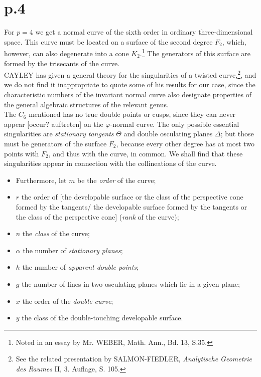 \documentclass[leqno]{article}
\begin{document}
\section{p.4}
For $ p = 4 $ we get a normal curve of the sixth order in ordinary three-dimensional space. This curve must be located on a surface of the second degree $ F_2 $, which, however, can also degenerate into a cone $ K_2 $.\footnote{Noted in an essay by Mr. WEBER, Math. Ann., Bd. 13, S.35.} The generators of this surface are formed by the trisecants of the curve. \\
CAYLEY has given a general theory for the singularities of a twisted curve,\footnote{See the related presentation by SALMON-FIEDLER, \textit{Analytische Geometrie des Raumes} II, 3. Auflage, S. 105.}, and we do not find it inappropriate to quote some of his results for our case, since the characteristic numbers of the invariant normal curve also designate properties of the general algebraic structures of the relevant genus. \\
The $ C_6 $ mentioned has no true double points or cusps, since they can never appear [occur? auftreten] on the $\varphi$-normal curve. The only possible essential singularities are \textit{stationary tangents} $ \Theta $ and double osculating planes $ \Delta $; but those must be generators of the surface $ F_2 $, because every other degree has at most two points with $ F_2 $, and thus with the curve, in common. We shall find that these singularities appear in connection with the collineations of the curve. 
\begin{itemize}[label={}]
	\item Furthermore, let $ m $ be the  \textit{order} of the curve; 
	\item $ r $ the order of [the developable surface or the class of the perspective cone formed by the tangents/ the developable surface formed by the tangents or the class of the perspective cone] (\textit{rank} of the curve);
	\item $ n $ the \textit{class} of the curve;
	\item $\alpha$ the number of \textit{stationary planes};
	\item $ h $ the number of \textit{apparent double points};
	\item $ g $ the number of lines in two osculating planes which lie in a given plane;
	\item $ x $ the order of the \textit{double curve};
	\item $ y $ the class of the double-touching developable surface.
\end{itemize}
\end{document}
